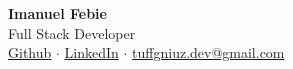\documentclass[a4paper, 12pt]{article}
\begin{document}
\begin{center}
  {\Huge \textbf{Imanuel Febie}}\\
  \vspace{1em}
  {\Large Full Stack Developer}\\
  \vspace{1em}
  \faGithub \hspace{0.3em} \href{https://github.com/tuffgniuz}{Github} $\cdot$ 
  \faLinkedin \hspace{0.3em}  \href{https://linkedin.com/manufebie}{LinkedIn} $\cdot$ 
  \faEnvelopeSquare \hspace{0.3em} \href{mailto:imanuelfebie@gmail.com}{tuffgniuz.dev@gmail.com}
\end{center}






\end{document}
